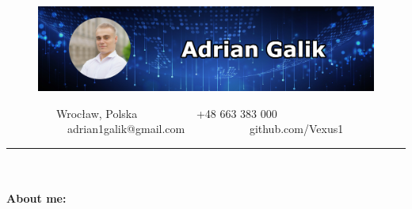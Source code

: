 \documentclass[10pt]{article}
\newcommand{\longline}{\rule{19.6cm}{1pt}}
\begin{document}
\begin{figure}[t]
    \hskip-1.55cm\includegraphics[scale=1.3625]{Galik_BANNER.png}
\end{figure}

\vspace*{-4ex}

\ \ \ \ \ \ \ \ \
\faMapMarker* Wrocław, Polska \ \ \ \ \ \ \ \ \ \
\faPhone +48 663 383 000 \ \ \ \ \ \ \ \ \ \
\faEnvelope \ adrian1galik@gmail.com \ \ \ \ \ \ \ \ \ \
\faGithub \ github.com/Vexus1


\noindent \longline 
\\ \\
\noindent \fontsize{14pt}{14pt}\selectfont \textbf{\color{Violet}About me:}
\fontsize{10pt}{10pt}\selectfont
\end{document}
